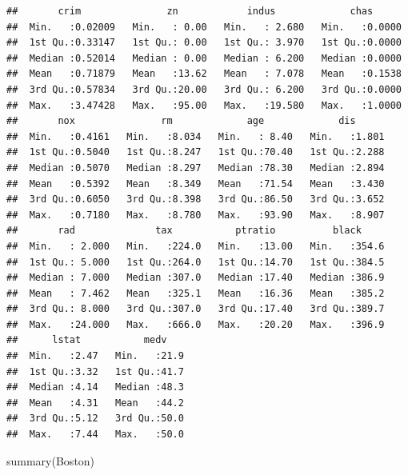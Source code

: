 \documentclass[
]{article}
\newenvironment{Shaded}{\begin{snugshade}}{\end{snugshade}}
\newcommand{\FunctionTok}[1]{\textcolor[rgb]{0.00,0.00,0.00}{#1}}
\newcommand{\NormalTok}[1]{#1}
\begin{document}
\begin{verbatim}
##       crim               zn            indus             chas       
##  Min.   :0.02009   Min.   : 0.00   Min.   : 2.680   Min.   :0.0000  
##  1st Qu.:0.33147   1st Qu.: 0.00   1st Qu.: 3.970   1st Qu.:0.0000  
##  Median :0.52014   Median : 0.00   Median : 6.200   Median :0.0000  
##  Mean   :0.71879   Mean   :13.62   Mean   : 7.078   Mean   :0.1538  
##  3rd Qu.:0.57834   3rd Qu.:20.00   3rd Qu.: 6.200   3rd Qu.:0.0000  
##  Max.   :3.47428   Max.   :95.00   Max.   :19.580   Max.   :1.0000  
##       nox               rm             age             dis       
##  Min.   :0.4161   Min.   :8.034   Min.   : 8.40   Min.   :1.801  
##  1st Qu.:0.5040   1st Qu.:8.247   1st Qu.:70.40   1st Qu.:2.288  
##  Median :0.5070   Median :8.297   Median :78.30   Median :2.894  
##  Mean   :0.5392   Mean   :8.349   Mean   :71.54   Mean   :3.430  
##  3rd Qu.:0.6050   3rd Qu.:8.398   3rd Qu.:86.50   3rd Qu.:3.652  
##  Max.   :0.7180   Max.   :8.780   Max.   :93.90   Max.   :8.907  
##       rad              tax           ptratio          black      
##  Min.   : 2.000   Min.   :224.0   Min.   :13.00   Min.   :354.6  
##  1st Qu.: 5.000   1st Qu.:264.0   1st Qu.:14.70   1st Qu.:384.5  
##  Median : 7.000   Median :307.0   Median :17.40   Median :386.9  
##  Mean   : 7.462   Mean   :325.1   Mean   :16.36   Mean   :385.2  
##  3rd Qu.: 8.000   3rd Qu.:307.0   3rd Qu.:17.40   3rd Qu.:389.7  
##  Max.   :24.000   Max.   :666.0   Max.   :20.20   Max.   :396.9  
##      lstat           medv     
##  Min.   :2.47   Min.   :21.9  
##  1st Qu.:3.32   1st Qu.:41.7  
##  Median :4.14   Median :48.3  
##  Mean   :4.31   Mean   :44.2  
##  3rd Qu.:5.12   3rd Qu.:50.0  
##  Max.   :7.44   Max.   :50.0
\end{verbatim}

\begin{Shaded}
\begin{Highlighting}[]
\FunctionTok{summary}\NormalTok{(Boston)}
\end{Highlighting}
\end{Shaded}
\end{document}
